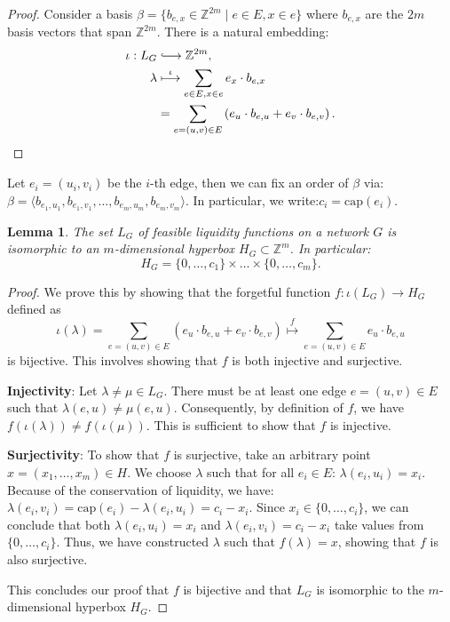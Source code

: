 \documentclass[10pt,twocolumn]{article}
\newtheorem{lemma}[theorem]{Lemma}
\newcommand{\longhookrightarrow}{\lhook\joinrel\longrightarrow}
\begin{document}
\begin{proof}
Consider a basis \( \beta = \{ b_{e,x} \in \mathbb{Z}^{2m} \mid e \in E, x \in e \} \) where \( b_{e,x} \) are the \(2m\) basis vectors that span \(\mathbb{Z}^{2m}\). There is a natural embedding:
\[
\begin{aligned}
\iota: L_G & \longhookrightarrow \mathbb{Z}^{2m}, \\
\lambda & \stackrel{\iota}{\longmapsto} \sum_{e \in E, x \in e} e_x \cdot b_{e,x} \\
& = \sum_{e=(u,v) \in E} \left( e_u \cdot b_{e,u} + e_v \cdot b_{e,v} \right).
\end{aligned}
\]
\end{proof}

Let \( e_i = (u_i, v_i) \) be the \( i \)-th edge, then we can fix an order of \( \beta \) via:
\( \beta = \langle b_{e_1, u_1}, b_{e_1, v_1}, \dots, b_{e_m, u_m}, b_{e_m, v_m} \rangle. \)
In particular, we write:\( c_i = \text{cap}(e_i). \)

\begin{lemma}
\label{lem:dimensionOfStatePolytope}
The set \( L_G \) of feasible liquidity functions on a network \( G \) is isomorphic to an \( m \)-dimensional hyperbox \( H_G \subset \mathbb{Z}^{m} \). In particular:
\[ H_G = \{ 0, \dots, c_1 \} \times \dots \times \{ 0, \dots, c_m \}. \]
\end{lemma}
\begin{proof}
We prove this by showing that the forgetful function \( f: \iota(L_G) \longrightarrow H_G \) defined as
\[ \iota(\lambda) = \sum_{e=(u,v) \in E} \left( e_u \cdot b_{e,u} + e_v \cdot b_{e,v} \right) \stackrel{f}{\longmapsto} \sum_{e=(u,v) \in E} e_u \cdot b_{e,u} \]
is bijective. This involves showing that \( f \) is both injective and surjective.

\textbf{Injectivity}: Let \( \lambda \neq \mu \in L_G \). There must be at least one edge \( e=(u,v) \in E \) such that \( \lambda(e,u) \neq \mu(e,u) \). Consequently, by definition of \( f \), we have \( f(\iota(\lambda)) \neq f(\iota(\mu)) \). This is sufficient to show that \( f \) is injective.

\textbf{Surjectivity}: To show that \( f \) is surjective, take an arbitrary point \( x = (x_1, \dots, x_m) \in H \). We choose \( \lambda \) such that for all \( e_i \in E \):
\( \lambda(e_i, u_i) = x_i. \)
Because of the conservation of liquidity, we have:
\( \lambda(e_i, v_i) = \text{cap}(e_i) - \lambda(e_i, u_i) = c_i - x_i. \)
Since \( x_i \in \{0, \dots, c_i\} \), we can conclude that both \( \lambda(e_i, u_i) = x_i \) and \( \lambda(e_i, v_i) = c_i - x_i \) take values from \(\{0, \dots, c_i\}\). Thus, we have constructed \( \lambda \) such that \( f(\lambda) = x \), showing that \( f \) is also surjective.

This concludes our proof that \( f \) is bijective and that \( L_G \) is isomorphic to the \( m \)-dimensional hyperbox \( H_G \).
\end{proof}
\end{document}
